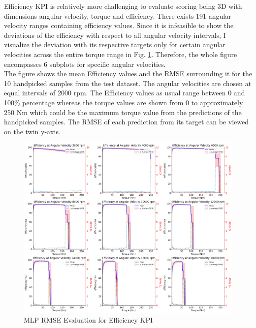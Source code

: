 \documentclass{report} %
\begin{document}
Efficiency \ac{KPI} is relatively more challenging to evaluate scoring being 3\ac{D} with dimensions angular velocity, torque and efficiency. 
There exists 191 angular velocity ranges containing efficiency values.
Since it is infeasible to show the deviations of the efficiency with respect to all angular velocity intervals, I visualize the deviation with its respective targets 
only for certain angular velocities across the entire torque range in Fig. \ref{fig:MLP RMSE Evaluation for Efficiency KPI}. 
Therefore, the whole figure encompasses 6 subplots for specific angular velocities.\\

The figure shows the mean Efficiency values and the \ac{RMSE} surrounding it for the 10 handpicked samples from the test dataset.
The angular velocities are chosen at equal intervals of 2000 rpm. The Efficiency values as usual range between 0 and 100\% percentage whereas the torque values are shown 
from 0 to approximately 250 Nm which could be the maximum torque value from the predictions of the handpicked samples.
The \ac{RMSE} of each prediction from its target can be viewed on the twin y-axis.

\begin{figure}[H]
    \centering
    \includegraphics[width=1\textwidth]{./ReportImages/rmse_eta_MLP.png} 
    \caption{\ac{MLP} \ac{RMSE} Evaluation for Efficiency \ac{KPI}} 
    \label{fig:MLP RMSE Evaluation for Efficiency KPI}
\end{figure}
\end{document}
